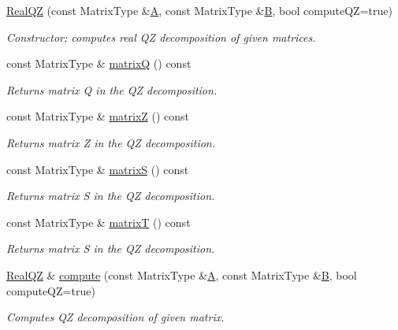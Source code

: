 \begin{DoxyCompactItemize}
\hyperlink{group___eigenvalues___module_ac6e41c839f8dae31c9a3906ea7540119}{Real\+QZ} (const Matrix\+Type \&\hyperlink{group___core___module_class_eigen_1_1_matrix}{A}, const Matrix\+Type \&\hyperlink{group___core___module_class_eigen_1_1_matrix}{B}, bool compute\+QZ=true)
\begin{DoxyCompactList}\small\item\em Constructor; computes real QZ decomposition of given matrices. \end{DoxyCompactList}\item 
const Matrix\+Type \& \hyperlink{group___eigenvalues___module_a212bc2f69ea4eff830fde70e209e40fb}{matrixQ} () const
\begin{DoxyCompactList}\small\item\em Returns matrix Q in the QZ decomposition. \end{DoxyCompactList}\item 
const Matrix\+Type \& \hyperlink{group___eigenvalues___module_a19a116383f11423179b4d8f316da6f67}{matrixZ} () const
\begin{DoxyCompactList}\small\item\em Returns matrix Z in the QZ decomposition. \end{DoxyCompactList}\item 
const Matrix\+Type \& \hyperlink{group___eigenvalues___module_ad24d7bf534afb55adaef00f00846adaf}{matrixS} () const
\begin{DoxyCompactList}\small\item\em Returns matrix S in the QZ decomposition. \end{DoxyCompactList}\item 
const Matrix\+Type \& \hyperlink{group___eigenvalues___module_a8dc963d8ea2a17df9d8d718e9e34d06f}{matrixT} () const
\begin{DoxyCompactList}\small\item\em Returns matrix S in the QZ decomposition. \end{DoxyCompactList}\item 
\hyperlink{group___eigenvalues___module_class_eigen_1_1_real_q_z}{Real\+QZ} \& \hyperlink{group___eigenvalues___module_ac080d8745efeaa2bd6bfd61740f740c7}{compute} (const Matrix\+Type \&\hyperlink{group___core___module_class_eigen_1_1_matrix}{A}, const Matrix\+Type \&\hyperlink{group___core___module_class_eigen_1_1_matrix}{B}, bool compute\+QZ=true)
\begin{DoxyCompactList}\small\item\em Computes QZ decomposition of given matrix. \end{DoxyCompactList}\item 

\end{DoxyCompactItemize}
